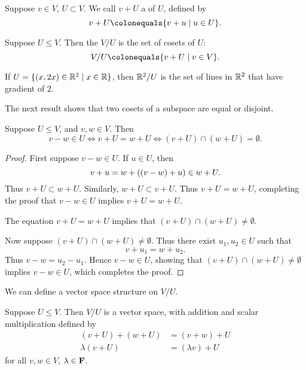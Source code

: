 \begin{definition}[Coset]
Suppose $v\in V$, $U\subset V$. We call $v+U$ a  of $U$, defined by
\[v+U\colonequals\{v+u\mid u\in U\}.\]
\end{definition}

\begin{definition}
Suppose $U\le V$. Then the  $V/U$ is the set of cosets of $U$:
\[V/U\colonequals\{v+U\mid v\in V\}.\]
\end{definition}

\begin{example}
If $U=\{(x,2x)\in\mathbb R^2\mid x\in\mathbb R\}$, then $\mathbb R^2/U$ is the set of lines in $\mathbb R^2$ that have gradient of $2$.
\end{example}

The next result shows that two cosets of a subspace are equal or disjoint.

\begin{lemma}\label{lemma:cosets-equal-disjoint}
Suppose $U\le V$, and $v,w\in V$. Then
\[v-w\in U\iff v+U=w+U\iff(v+U)\cap(w+U)=\emptyset.\]
\end{lemma}

\begin{proof}
First suppose $v-w\in U$. If $u\in U$, then
\[v+u=w+\left((v-w)+u\right)\in w+U.\]
Thus $v+U\subset w+U$. Similarly, $w+U \subset v+U$. Thus $v+U=w+U$, completing the proof that $v-w\in U$ implies $v+U=w+U$.

The equation $v+U=w+U$ implies that $(v+U)\cap(w+U)\neq\emptyset$.

Now suppose $(v+U)\cap(w+U)\neq\emptyset$. Thus there exist $u_1,u_2\in U$ such that
\[v+u_1=w+u_2.\]
Thus $v-w=u_2-u_1$. Hence $v-w\in U$, showing that $(v+U)\cap(w+U)\neq\emptyset$ implies $v-w\in U$, which completes the proof.
\end{proof}

We can define a vector space structure on $V/U$.

\begin{lemma}
Suppose $U\le V$. Then $V/U$ is a vector space, with addition and scalar multiplication defined by
\begin{align*}
(v+U)+(w+U)&=(v+w)+U\\
\lambda(v+U)&=(\lambda v)+U
\end{align*}
for all $v,w\in V$, $\lambda\in\mathbf F$.
\end{lemma}

